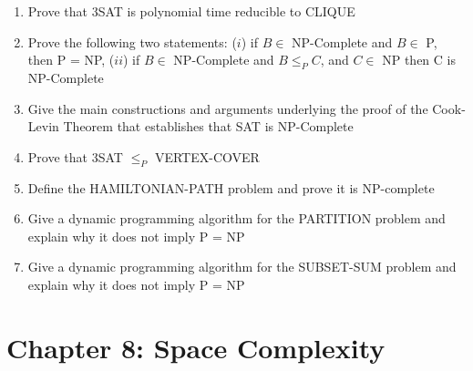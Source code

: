 \documentclass{article}
\begin{document}
\begin{enumerate}{}
\item Prove that 3SAT is polynomial time reducible to CLIQUE

\item Prove the following two statements: ($i$) if $B \in$ NP-Complete and $B \in$ P, then P = NP, ($ii$) if $B \in$ NP-Complete and $B \leq_{P} C$, and $C \in$ NP then C is NP-Complete

\item Give the main constructions and arguments underlying the proof of the Cook-Levin Theorem that establishes that SAT is NP-Complete

\item Prove that 3SAT $\leq_P$ VERTEX-COVER

\item Define the HAMILTONIAN-PATH problem and prove it is NP-complete

\item Give a dynamic programming algorithm for the PARTITION problem and explain why it does not imply P = NP

\item Give a dynamic programming algorithm for the SUBSET-SUM problem and explain why it does not imply P = NP

\end{enumerate}

\clearpage
\section{Chapter 8: Space Complexity}
\end{document}
